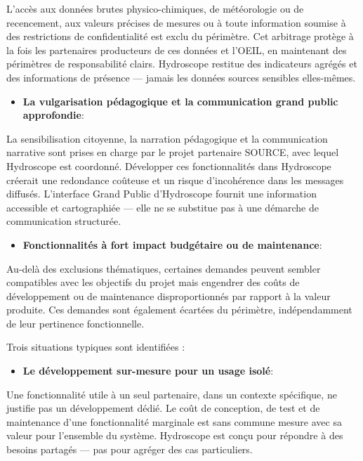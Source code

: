 \documentclass[
  french,
  11pt,
]{article}
\providecommand{\tightlist}{%
  \setlength{\itemsep}{0pt}\setlength{\parskip}{0pt}}
\begin{document}
L'accès aux données brutes physico-chimiques, de météorologie ou de
recencement, aux valeurs précises de mesures ou à toute information
soumise à des restrictions de confidentialité est exclu du périmètre.
Cet arbitrage protège à la fois les partenaires producteurs de ces
données et l'OEIL, en maintenant des périmètres de responsabilité
clairs. Hydroscope restitue des indicateurs agrégés et des informations
de présence --- jamais les données sources sensibles elles-mêmes.

\begin{itemize}
\tightlist
\item
  \textbf{La vulgarisation pédagogique et la communication grand public
  approfondie}:
\end{itemize}

La sensibilisation citoyenne, la narration pédagogique et la
communication narrative sont prises en charge par le projet partenaire
SOURCE, avec lequel Hydroscope est coordonné. Développer ces
fonctionnalités dans Hydroscope créerait une redondance coûteuse et un
risque d'incohérence dans les messages diffusés. L'interface Grand
Public d'Hydroscope fournit une information accessible et cartographiée
--- elle ne se substitue pas à une démarche de communication structurée.

\begin{itemize}
\tightlist
\item
  \textbf{Fonctionnalités à fort impact budgétaire ou de maintenance}:
\end{itemize}

Au-delà des exclusions thématiques, certaines demandes peuvent sembler
compatibles avec les objectifs du projet mais engendrer des coûts de
développement ou de maintenance disproportionnés par rapport à la valeur
produite. Ces demandes sont également écartées du périmètre,
indépendamment de leur pertinence fonctionnelle.

Trois situations typiques sont identifiées :

\begin{itemize}
\tightlist
\item
  \textbf{Le développement sur-mesure pour un usage isolé}:
\end{itemize}

Une fonctionnalité utile à un seul partenaire, dans un contexte
spécifique, ne justifie pas un développement dédié. Le coût de
conception, de test et de maintenance d'une fonctionnalité marginale est
sans commune mesure avec sa valeur pour l'ensemble du système.
Hydroscope est conçu pour répondre à des besoins partagés --- pas pour
agréger des cas particuliers.
\end{document}

